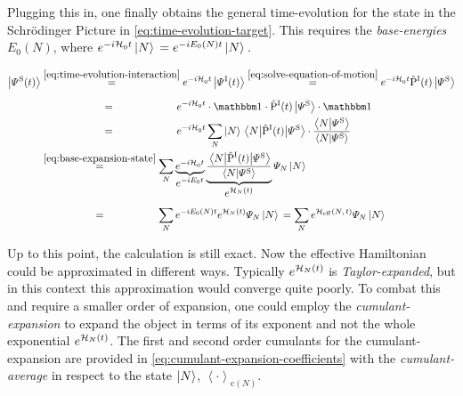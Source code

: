 Plugging this in, one finally obtains the general time-evolution for the state in the Schrödinger Picture in \autoref{eq:time-evolution-target}.
This requires the \emph{base-energies} $E_0(N)$, where $e^{-i \mathcal{H}_0^{}{} t}\ket{N}{} = e^{-i E_0(N) t}\ket{N}{}$.

\begin{equation}
    \label{eq:time-evolution-target}
    \begin{split}
        \ketpsiof[\schroedingerPicture]{t} &\stackrel{\ref{eq:time-evolution-interaction}}{=} e^{-i \HzeroHamiltonian{} t} \ketpsiof[\interactionPicture]{t} 
        \stackrel{\ref{eq:solve-equation-of-motion}}{=}
        e^{-i \HzeroHamiltonian{} t} \timeEvolutionOperator[\interactionPicture] \ketpsi[\schroedingerPicture]{} \\
        &\stackrel{\phantom{\ref{eq:solve-equation-of-motion}}}{=}
        e^{-i \HzeroHamiltonian{} t} \cdot \one \cdot  \timeEvolutionOperator[\interactionPicture] \ketpsi[\schroedingerPicture]{}\cdot \one\\
        &\stackrel{\phantom{\ref{eq:solve-equation-of-motion}}}{=}
        e^{-i \HzeroHamiltonian{} t} \lsum[N] \ketN{} \bracketHelper{N}{\timeEvolutionOperator[\interactionPicture]}{\picturePsi[\schroedingerPicture]{}} \cdot \frac{\braketHelper{N}{\picturePsi[\schroedingerPicture]{}}}{\braketHelper{N}{\picturePsi[\schroedingerPicture]{}}}\\
        &\stackrel{\ref{eq:base-expansion-state}}{=}
        \lsum[N] \underbrace{e^{-i \HzeroHamiltonian{} t}}_{\text{\normalsize{$e^{-i E_0 t}$}}}  \underbrace{\frac{\bracketHelper{N}{\timeEvolutionOperator[\interactionPicture]}{\picturePsi[\schroedingerPicture]{}}}{\braketHelper{N}{\picturePsi[\schroedingerPicture]{}}}}_{\text{\normalsize{$e^{\HNOft}$}}}  \psiN \ketN{}\\
        &\stackrel{\phantom{\ref{eq:base-expansion-state}}}{=}
        \lsum[N] e^{-i E_0(N) t}  e^{\HNOft} \psiN \ketN{} = 
        \lsum[N] e^{\HeffOft} \psiN \ketN{}
    \end{split}
\end{equation}

Up to this point, the calculation is still exact. Now the effective Hamiltonian \HNOft could be approximated in different ways. Typically $e^{\mathcal{H}_{N}(t)}$ is \emph{Taylor-expanded}, but in this context this approximation would converge quite poorly. 
To combat this and require a smaller order of expansion, one could employ the \emph{cumulant-expansion} \cite{cumulantExpansionOriginalDerivation} to expand the object in terms of its exponent \HNOft and not the whole exponential $e^{\mathcal{H}_{N}(t)}$.
The first and second order cumulants for the cumulant-expansion are provided in \autoref{eq:cumulant-expansion-coefficients} \cite{variationalClassicalNetworksPaper} with the \emph{cumulant-average} in respect to the state $\ket{N}$, $\left\langle\cdot\right\rangle_{\text{c}(N)}$.

